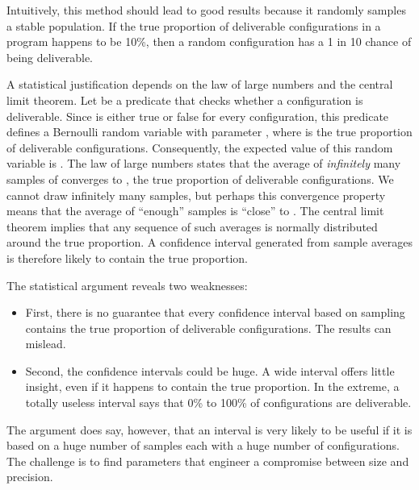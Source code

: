 \documentclass[ twoside,open=right,titlepage,numbers=noenddot,headinclude,%
                footinclude=true,cleardoublepage=empty,abstract=off,
                BCOR=5mm,paper=a4,fontsize=11pt,%
                ngerman,american,%
                parts,pdfspacing]{scrreprt}
\newlength{\stabLeft}
\newcommand{\atItemizeStart}[0]{\addtolength{\stabLeft}{\labelsep}
                                \addtolength{\stabLeft}{\labelwidth}}
\begin{document}
Intuitively, this method should lead to good results because
 it randomly samples a stable population.
If the true proportion of deliverable configurations in a program
 happens to be 10\%, then a random configuration has a 1 in 10
 chance of being deliverable.

A statistical justification depends on the law of large numbers
 and the central limit theorem.
Let  be a predicate that checks whether a configuration
 is deliverable.
Since  is either true or false for every configuration,
 this predicate defines a Bernoulli random variable  with parameter
 , where  is the true proportion of deliverable configurations.
Consequently, the expected value of this random variable is .
The law of large numbers states that the average of \emph{infinitely}
 many samples of  converges to , the true proportion
 of deliverable configurations.
We cannot draw infinitely many samples, but perhaps this convergence
 property means that the average of {``}enough{''} samples is {``}close{''} to .
The central limit theorem implies that any sequence of
 such averages is normally distributed around the true proportion.
A  confidence interval generated from sample averages is therefore
 likely to contain the true proportion.

The statistical argument reveals two weaknesses:

\begin{itemize}\atItemizeStart

\item First, there is no guarantee that every confidence interval based on sampling
 contains the true proportion of deliverable configurations.
The results can mislead.

\item Second, the confidence intervals could be huge.
A wide interval offers little insight, even if it happens to contain the
 true proportion.
In the extreme, a totally useless interval says that 0\% to 100\% of configurations
 are deliverable.\end{itemize}

\noindent{}The argument does say, however, that an interval is very likely to
 be useful if it is based on a huge number of samples each with a huge number
 of configurations.
The challenge is to find parameters that engineer a compromise between
 size and precision.
\end{document}
